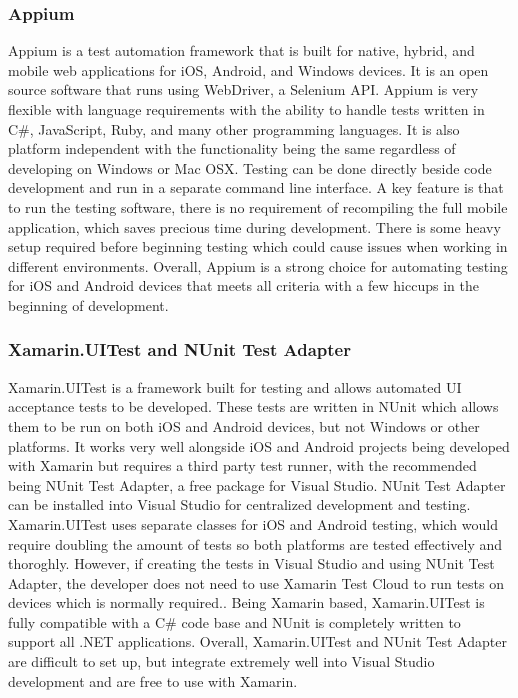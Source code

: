 \documentclass[onecolumn, draftclsnofoot,10pt, compsoc]{IEEEtran}
\begin{document}
\begin{singlespace}
\subsubsection{Appium}
Appium is a test automation framework that is built for native, hybrid, and mobile web applications for  iOS, Android, and Windows devices. It is an open source software that runs using WebDriver, a Selenium API.
Appium is very flexible with language requirements with the ability to handle tests written in C\#, JavaScript, Ruby, and many other programming languages. It is also platform independent with the functionality being
the same regardless of developing on Windows or Mac OSX. Testing can be done directly beside code development and run in a separate command line interface. A key feature is that to  run the testing software, there is 
no requirement of recompiling the full mobile application, which saves precious time during development. There is some heavy setup required before beginning testing which could cause issues when working in different environments.
Overall, Appium is a strong choice for automating testing for iOS and Android devices that meets all criteria with a few hiccups in the beginning of development.

\subsubsection{Xamarin.UITest and NUnit Test Adapter}

Xamarin.UITest is a framework built for testing and allows automated UI acceptance tests to be developed. These tests are written in NUnit which allows them to be run on both iOS and Android devices, but not Windows 
or other platforms. It works very well alongside iOS and Android projects being developed with Xamarin but requires a third party test runner, with the recommended being NUnit Test Adapter, a free package for Visual 
Studio. NUnit Test Adapter can be installed into Visual Studio for centralized development and testing. Xamarin.UITest uses separate classes for iOS and  Android testing, which would require doubling the amount of tests
so both platforms are tested effectively and thoroghly. However, if creating the tests in Visual Studio and using NUnit Test Adapter, the  developer does not need to use Xamarin Test Cloud to run tests on devices 
which is normally  required.. Being Xamarin based, Xamarin.UITest is fully compatible with a C\# code base and NUnit is  completely written to support all .NET applications. 
Overall, Xamarin.UITest and NUnit Test Adapter are difficult to set up, but integrate extremely well into Visual Studio development and are free to use with Xamarin.


\end{singlespace}
\end{document}

